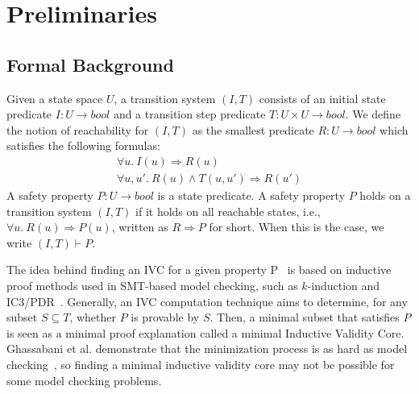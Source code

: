 \section{Preliminaries}
\label{sec:prelim}
\newcommand{\bool}[0]{\mathit{bool}}
\newcommand{\reach}[0]{\mathit{R}}
\newcommand{\ite}[3]{\mathit{if}\ {#1}\ \mathit{then}\ {#2}\ \mathit{else}\ {#3}}




\subsection{Formal Background}
Given a state space $U$, a transition system $(I,T)$ consists of an
initial state predicate $I : U \to \bool$ and a transition step
predicate $T : U \times U \to \bool$.
We define the notion of
reachability for $(I, T)$ as the smallest predicate $\reach : U \to
\bool$ which satisfies the following formulas:
\begin{gather*}
  \forall u.~ I(u) \Rightarrow \reach(u) \\
  \forall u, u'.~ \reach(u) \land T(u, u') \Rightarrow \reach(u')
\end{gather*}
A safety property $P : U \to \bool$ is a state predicate. A safety
property $P$ holds on a transition system $(I, T)$ if it holds on all
reachable states, i.e., $\forall u.~ \reach(u) \Rightarrow P(u)$,
written as $\reach \Rightarrow P$ for short. When this is the case, we
write $(I, T)\vdash P$.


The idea behind finding an IVC for a given property P~\cite{GhassabaniGW16} is based on inductive proof methods used in SMT-based model checking, such as $\mathit{k}$-induction and IC3/PDR~\cite{een2011efficient, kahsai2012incremental, cook1971complexity}. Generally, an IVC computation technique aims to determine, for any subset $S \subseteq T$, whether $\mathit{P}$ is provable by $\mathit{S}$. Then, a minimal subset that satisfies $\mathit{P}$ is seen as a minimal proof explanation called a minimal Inductive Validity Core. Ghassabani et al. demonstrate that the minimization process is as hard as model checking~\cite{Ghassabani2017EfficientGO}, so finding a minimal inductive validity core may not be possible for some model checking problems. 

